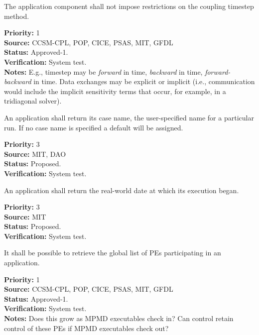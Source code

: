 The application component shall not impose restrictions on the
coupling timestep method.  
\begin{reqlist}
{\bf Priority:}  1 \\ 
{\bf Source:}  CCSM-CPL, POP, CICE, PSAS, MIT, GFDL \\
{\bf Status:} Approved-1. \\
{\bf Verification:} System test. \\ 
{\bf Notes:} E.g., timestep may be \emph{forward} in time,
\emph{backward} in time, \emph{forward-backward} in time.  Data exchanges may be
explicit or implicit (i.e., communication would include the implicit sensitivity 
terms that occur, for example, in a tridiagonal solver).
\end{reqlist}


An application shall return its case name, the user-specified name for 
a particular run.  If no case name is specified a default will 
be assigned.
\begin{reqlist}
{\bf Priority:} 3 \\
{\bf Source:} MIT, DAO \\
{\bf Status:} Proposed.\\
{\bf Verification:} System test. 
\end{reqlist}

An application shall return the real-world date at which its execution
began.
\begin{reqlist}
{\bf Priority:} 3\\
{\bf Source:} MIT \\
{\bf Status:} Proposed.\\
{\bf Verification:} System test.
\end{reqlist}

It shall be possible to retrieve the global list of PEs participating 
in an application.
\begin{reqlist}
{\bf Priority:} 1 \\
{\bf Source:}  CCSM-CPL, POP, CICE, PSAS, MIT, GFDL \\
{\bf Status:} Approved-1. \\
{\bf Verification:} System test. \\ 
{\bf Notes:}  Does this grow as MPMD executables check in? Can control
  retain control of these PEs if MPMD executables check out?
\end{reqlist}

